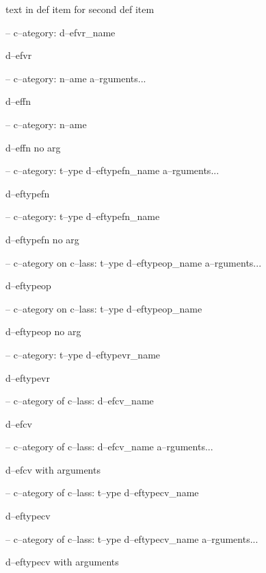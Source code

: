 \documentclass{book}
\begin{document}
\begin{titlepage}
%
text in def item for second def item


\hbox{}-- c--ategory: d--efvr\_name


%
d--efvr

\hbox{}-- c--ategory: n--ame a--rguments...


%
d--effn

\hbox{}-- c--ategory: n--ame


%
d--effn no arg

\hbox{}-- c--ategory: t--ype d--eftypefn\_name a--rguments...


%
d--eftypefn

\hbox{}-- c--ategory: t--ype d--eftypefn\_name


%
d--eftypefn no arg

\hbox{}-- c--ategory on c--lass: t--ype d--eftypeop\_name a--rguments...


%
d--eftypeop

\hbox{}-- c--ategory on c--lass: t--ype d--eftypeop\_name


%
d--eftypeop no arg

\hbox{}-- c--ategory: t--ype d--eftypevr\_name


%
d--eftypevr

\hbox{}-- c--ategory of c--lass: d--efcv\_name


%
d--efcv

\hbox{}-- c--ategory of c--lass: d--efcv\_name a--rguments...


%
d--efcv with arguments

\hbox{}-- c--ategory of c--lass: t--ype d--eftypecv\_name


%
d--eftypecv

\hbox{}-- c--ategory of c--lass: t--ype d--eftypecv\_name a--rguments...


%
d--eftypecv with arguments


\end{titlepage}
\end{document}
